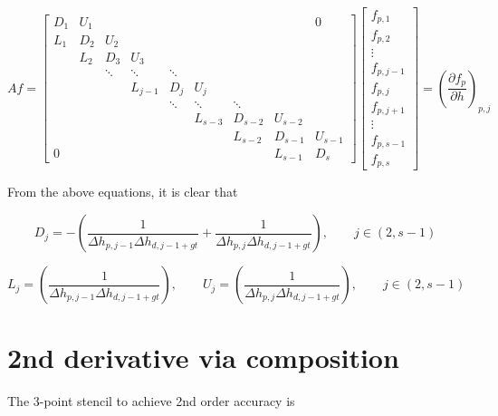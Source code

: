 \documentclass[11pt]{article}
\begin{document}
\[
Af =
\left[
\begin{array}{ccccccccc}
D_{1} & U_{1} &  &   &   &   &   &   & 0 \\
L_{1} & D_{2} & U_{2} &   &   &   &   &   &   \\
  & L_{2} & D_{3} & U_{3} &   &   &   &   &   \\
  &   & \ddots & \ddots & \ddots &   &   &   &   \\
  &   &   & L_{j-1} & D_{j} & U_{j} &   &   &   \\
  &   &   &   & \ddots & \ddots & \ddots &   &   \\
  &   &   &   &   & L_{s-3} & D_{s-2} & U_{s-2} &   \\
  &   &   &   &   &   & L_{s-2} & D_{s-1} & U_{s-1} \\
0 &   &   &   &   &   &   & L_{s-1} & D_{s}
\end{array}
\right]
\left[ \begin{array}{c}
f_{p,1} \\ f_{p,2} \\ \vdots \\ f_{p,j-1} \\ f_{p,j} \\ f_{p,j+1} \\ \vdots \\ f_{p,s-1} \\ f_{p,s}
\end{array} \right]
 = \left( \frac{\partial f_{p}}{\partial h} \right)_{p,j}
\]

From the above equations, it is clear that

\begin{equation}
  D_j = -\left( \frac{1}{\Delta h_{p,j-1} \Delta h_{d,j-1+gt}} + \frac{1}{\Delta h_{p,j} \Delta h_{d,j-1+gt}} \right), \qquad j \in (2,s-1)
\end{equation}

\begin{equation}
  L_j = \left( \frac{1}{\Delta h_{p,j-1} \Delta h_{d,j-1+gt}} \right), \qquad
  U_j = \left( \frac{1}{\Delta h_{p,j} \Delta h_{d,j-1+gt}} \right), \qquad j \in (2,s-1)
\end{equation}

\section{2nd derivative via composition}

The 3-point stencil to achieve 2nd order accuracy is
\end{document}
